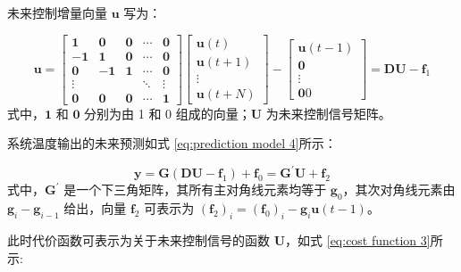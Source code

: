 未来控制增量向量 $\mathbf{u}$ 写为：\par
\begin{equation}
    \mathbf{u}=
        \left[\begin{array}{ccccc}
            \boldsymbol{1} & \boldsymbol{0} & \boldsymbol{0} & \cdots & \boldsymbol{0} \\
            -\boldsymbol{1} & \boldsymbol{1} & \boldsymbol{0} & \cdots & \boldsymbol{0} \\
            \boldsymbol{0} & -\boldsymbol{1} & \boldsymbol{1} & \cdots & \boldsymbol{0} \\
            \vdots & & & \ddots & \vdots \\
            \boldsymbol{0} & \boldsymbol{0} & \boldsymbol{0} & \cdots & \boldsymbol{1}
        \end{array}\right]
        \left[\begin{array}{c}
            \boldsymbol{u}(t) \\ \boldsymbol{u}(t+1) \\ \vdots \\ \boldsymbol{u}(t+N)
        \end{array}\right] - 
        \left[\begin{array}{c}
            \boldsymbol{u}(t-1) \\ \boldsymbol{0} \\ \vdots \\ \boldsymbol{0}0
        \end{array}\right] = 
        \mathbf{DU}-\mathbf{f}_{1}
\end{equation}
式中，$\boldsymbol{1}$ 和 $\boldsymbol{0}$ 分别为由 1 和 0 组成的向量；$\mathbf{U}$ 为未来控制信号矩阵。\par
系统温度输出的未来预测如式 \ref{eq:prediction model 4}所示：\par
\begin{equation}
    \mathbf{y}=\mathbf{G}(\mathbf{DU}-\mathbf{f}_{1})+\mathbf{f}_{0}=\mathbf{G}^{\prime} \mathbf{U}+\mathbf{f}_{2}
    \label{eq:prediction model 4}
\end{equation}
式中，$\mathbf{G}^{\prime}$ 是一个下三角矩阵，其所有主对角线元素均等于 $\boldsymbol{g}_0$，其次对角线元素由 $\boldsymbol{g}_i-\boldsymbol{g}_{i-1}$ 给出，向量 $\mathbf{f}_{2}$ 可表示为 $(\mathbf{f}_{2})_{i}=(\mathbf{f}_{0})_{i}-\boldsymbol{g}_{i} \boldsymbol{u}(t-1)$。\par
此时代价函数可表示为关于未来控制信号的函数 $\mathbf{U}$，如式 \ref{eq:cost function 3}所示:\par
